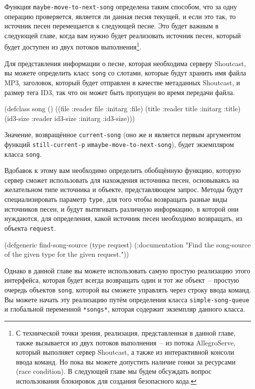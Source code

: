 Функция \lstinline{maybe-move-to-next-song} определена таким способом, что за одну
операцию проверяется, является ли данная песня текущей, и если это так, то источник песен
перемещается к следующей песне.  Это будет важным в следующей главе, когда вам нужно будет
реализовать источник песен, который будет доступен из двух потоков выполнения\footnote{С
  технической точки зрения, реализация, представленная в данной главе, также вызывается из
  двух потоков выполнения~-- из потока AllegroServe, который выполняет сервер Shoutcast, а
  также из интерактивной консоли ввода команд.  Но пока вы можете допустить наличие гонки
  за ресурсами (race condition).  В следующей главе мы будем обсуждать вопрос
  использования блокировок для создания безопасного кода.}.

Для представления информации о песне, которая необходима серверу Shoutcast, вы можете
определить класс \lstinline{song} со слотами, которые будут хранить имя файла MP3, заголовок,
который будет отправлен в качестве метаданных Shoutcast, и размер тега ID3, так что он
может быть пропущен во время передачи файла.

\begin{myverb}
(defclass song ()
  ((file     :reader file     :initarg :file)
   (title    :reader title    :initarg :title)
   (id3-size :reader id3-size :initarg :id3-size)))
\end{myverb}

Значение, возвращённое \lstinline{current-song} (оно же и является первым аргументом функций
\lstinline{still-current-p} и\lstinline{maybe-move-to-next-song}), будет экземпляром класса
\lstinline{song}.

Вдобавок к этому вам необходимо определить обобщённую функцию, которую сервер сможет
использовать для нахождения источника песен, основываясь на желательном типе источника и
объекте, представляющем запрос.  Методы будут специализировать параметр \lstinline{type}, для
того чтобы возвращать разные виды источников песен, и будут вытягивать различную
информацию, в которой они нуждаются, для определения, какой источник песен необходимо
возвращать, из объекта \lstinline{request}.

\begin{myverb}
(defgeneric find-song-source (type request)
  (:documentation "Find the song-source of the given type for the given request."))
\end{myverb}

Однако в данной главе вы можете использовать самую простую реализацию этого интерфейса,
которая будет всегда возвращать один и тот же объект~-- простую очередь объектов
\lstinline{song}, которой вы сможете управлять через строку ввода команд. Вы можете начать эту
реализацию путём определения класса \lstinline{simple-song-queue} и глобальной переменной
\lstinline{*songs*}, которая содержит экземпляр данного класса.

